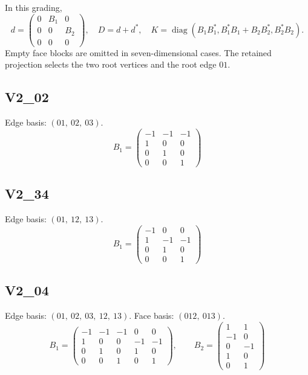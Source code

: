 In this grading,
\[
d=\begin{pmatrix}0&B_1&0\\0&0&B_2\\0&0&0\end{pmatrix},\quad
D=d+d^*,\quad
K=\operatorname{diag}(B_1B_1^*,B_1^*B_1+B_2B_2^*,B_2^*B_2).
\]
Empty face blocks are omitted in seven-dimensional cases. The retained projection selects the two root vertices and the root edge $01$.

\subsection*{V2\_02}\label{section:matrices:v2-02}
Edge basis: $(01,\ 02,\ 03)$.
\[
B_1=\left(\begin{matrix}-1 & -1 & -1\\1 & 0 & 0\\0 & 1 & 0\\0 & 0 & 1\end{matrix}\right)
\]

\subsection*{V2\_34}\label{section:matrices:v2-34}
Edge basis: $(01,\ 12,\ 13)$.
\[
B_1=\left(\begin{matrix}-1 & 0 & 0\\1 & -1 & -1\\0 & 1 & 0\\0 & 0 & 1\end{matrix}\right)
\]

\subsection*{V2\_04}\label{section:matrices:v2-04}
Edge basis: $(01,\ 02,\ 03,\ 12,\ 13)$.
Face basis: $(012,\ 013)$.
\[
B_1=\left(\begin{matrix}-1 & -1 & -1 & 0 & 0\\1 & 0 & 0 & -1 & -1\\0 & 1 & 0 & 1 & 0\\0 & 0 & 1 & 0 & 1\end{matrix}\right),\qquad B_2=\left(\begin{matrix}1 & 1\\-1 & 0\\0 & -1\\1 & 0\\0 & 1\end{matrix}\right)
\]

